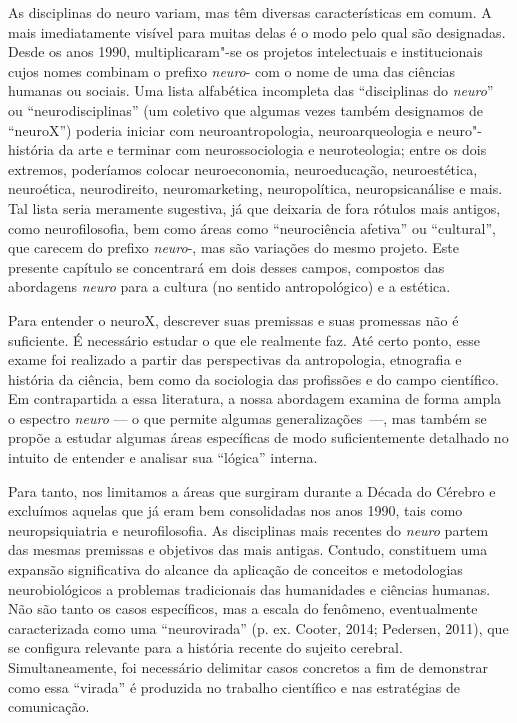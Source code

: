 As disciplinas do neuro variam, mas têm diversas características em
comum. A mais imediatamente visível para muitas delas é o modo pelo qual
são designadas. Desde os anos 1990, multiplicaram"-se os projetos
intelectuais e institucionais cujos nomes combinam o prefixo
\emph{neuro}- com o nome de uma das ciências humanas ou sociais. Uma
lista alfabética incompleta das ``disciplinas do \emph{neuro}'' ou
``neurodisciplinas'' (um coletivo que algumas vezes também designamos de
``neuroX'') poderia iniciar com neuroantropologia, neuroarqueologia e
neuro"-história da arte e terminar com neurossociologia e neuroteologia;
entre os dois extremos, poderíamos colocar neuroeconomia, neuroeducação,
neuroestética, neuroética, neurodireito, neuromarketing, neuropolítica,
neuropsicanálise e mais. Tal lista seria meramente sugestiva, já que
deixaria de fora rótulos mais antigos, como neurofilosofia, bem como
áreas como ``neurociência afetiva'' ou ``cultural'', que carecem
do prefixo \emph{neuro}-, mas são variações do mesmo projeto. Este
presente capítulo se concentrará em dois desses campos, compostos das
abordagens \emph{neuro} para a cultura (no sentido antropológico) e a
estética.

Para entender o neuroX, descrever suas premissas e suas
promessas não é suficiente. É necessário estudar o que ele realmente faz. Até certo
ponto, esse exame foi realizado a partir das perspectivas da
antropologia, etnografia e história da ciência, bem como da sociologia
das profissões e do campo científico. Em contrapartida a essa
literatura, a nossa abordagem examina de forma ampla o espectro
\emph{neuro} --- o que permite algumas generalizações~---, mas também se
propõe a estudar algumas áreas específicas de modo suficientemente
detalhado no intuito de entender e analisar sua ``lógica'' interna.

Para tanto, nos limitamos a áreas que surgiram durante a Década do
Cérebro e excluímos aquelas que já eram bem consolidadas nos
anos 1990, tais como neuropsiquiatria e neurofilosofia. As disciplinas
mais recentes do \emph{neuro} partem das mesmas premissas e
objetivos das mais antigas. Contudo, constituem uma expansão
significativa do alcance da aplicação de conceitos e metodologias
neurobiológicos a problemas tradicionais das humanidades e ciências
humanas. Não são tanto os casos específicos, mas a escala do
fenômeno, eventualmente caracterizada como uma ``neurovirada'' (p. ex.
Cooter, 2014; Pedersen, 2011), que se configura relevante para a
história recente do sujeito cerebral. Simultaneamente, foi necessário
delimitar casos concretos a fim de demonstrar como essa ``virada'' é
produzida no trabalho científico e nas estratégias de comunicação.

